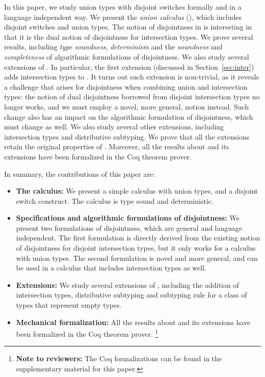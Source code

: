 In this paper, we study union types with disjoint switches formally
and in a language independent way. We present the \emph{union
  calculus} (\cal), which includes disjoint switches and union types.
The notion of disjointness in \cal is interesting in that it is
the dual notion of disjointness for intersection types.
We prove several results, including \emph{type soundness}, \emph{determinism}
and the \emph{soundness} and \emph{completeness} of algorithmic formulations
of disjointness.
We also study several extensions of \cal. In particular,
the first extension (discussed in Section~\ref{sec:inter}) adds intersection
types to \cal. It turns out such extension is non-trivial, as it reveals
a challenge that arises for disjointness when combining
union and intersection types:
the notion of dual disjointness borrowed from
disjoint intersection types no longer works, and we must employ
a novel, more general, notion instead. Such change also has an impact
on the algorithmic formulation of disjointness, which must change as
well. We also study several other extensions, including intersection
types and distributive subtyping. We prove that all the extensions retain
the original properties of \cal. Moreover, all the results about \cal and its
extensions have been formalized in the Coq theorem prover.

In summary, the contributions of this paper are:

\begin{itemize}
\item {\bf The \name calculus:} We present a simple calculus with union
  types, and a disjoint switch construct. The calculus is type sound and
  deterministic. 
\item {\bf Specifications and algorithmic formulations of disjointness:}
  We present two formulations of disjointness, which are general and
  language independent. The first formulation is directly derived from
  the existing notion of disjointness for disjoint intersection types,
  but it only works for a calculus with union types. The second formulation
  is novel and more general, and can be used in a calculus that includes
  intersection types as well.
\item {\bf Extensions:} We study several extensions of \name, including the
  addition of intersection types, distributive subtyping and
  subtyping rule for a class of types that represent empty types.
\item {\bf Mechanical formalization:}
  All the results about \cal and its
  extensions have been formalized in the Coq theorem prover.
  \footnote{{\bf Note to reviewers:} The Coq formalizations can be found in the
  supplementary material for this paper.}
\end{itemize}



